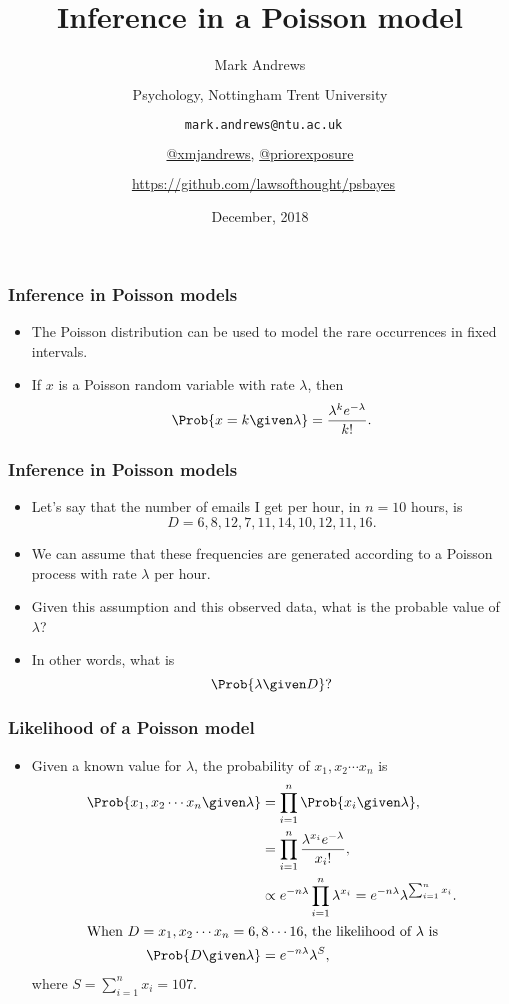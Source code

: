 \documentclass{slides}
\title[Bayesian Inference]{Inference in a Poisson model}
\author[Andrews]{Mark Andrews \\ $\phantom{foo}$ \\ Psychology, Nottingham Trent University \\ $\phantom{foo}$ \\ \faEnvelopeO \  \texttt{mark.andrews@ntu.ac.uk} \\ $\phantom{foo}$ \\ \faTwitter \href{https://twitter.com/xmjandrews}{@xmjandrews}, \faTwitter \href{https://twitter.com/priorexposure}{@priorexposure}\\ $\phantom{foo}$ \\ \faGithub \ \url{https://github.com/lawsofthought/psbayes}}
\date{December, 2018}
\begin{document}
{
	\begin{frame}
		\titlepage
	\end{frame}
}


	\begin{frame}
		\frametitle{Inference in Poisson models}
		\begin{itemize}
			\item The Poisson distribution can be used to model the rare occurrences in fixed intervals.
			\item If $x$ is a Poisson random variable with rate $\lambda$, then 
				\[\Prob{x = k \given \lambda} = \frac{\lambda^k e^{-\lambda}}{k!}.\]
		\end{itemize}
		
	\end{frame}
	
	\begin{frame}
		\frametitle{Inference in Poisson models}
		\begin{itemize}
			\item Let's say that the number of emails I get per hour, in $n=10$ hours, is 
				\[D = 6, 8, 12,  7, 11, 14, 10, 12, 11, 16.\]
			\item We can assume that these frequencies are generated according to a Poisson process with rate $\lambda$ per hour.
			\item Given this assumption and this observed data, what is the probable value of $\lambda$?
			\item In other words, what is 
				\[
					\Prob{\lambda \given D}?
				\]
		\end{itemize}
	\end{frame}

	\begin{frame}
		\frametitle{Likelihood of a Poisson model}
		\begin{itemize}
			\item Given a known value for $\lambda$, the probability of $x_1, x_2 \cdots x_n$ is 
				\begin{align*}
					\Prob{x_1, x_2 \cdots x_n \given \lambda} &= \prod_{i=1}^n \Prob{x_i \given \lambda},\\
					&= \prod_{i=1}^n \frac{\lambda^{x_i}e^{-\lambda}}{x_i!},\\
					&\propto e^{-n\lambda}\prod_{i=1}^n \lambda^{x_i} = e^{-n\lambda} \lambda^{\sum_{i=1}^{n}x_i}.\\
					\intertext{When $D = x_1, x_2 \cdots x_n = 6, 8 \cdots 16$, the likelihood of $\lambda$ is}
					\Prob{D \given \lambda} &= e^{-n\lambda} \lambda^{S},
				\end{align*}
				where $S = \sum_{i=1}^{n} x_i = 107$.
		\end{itemize}
	\end{frame}
\end{document}
